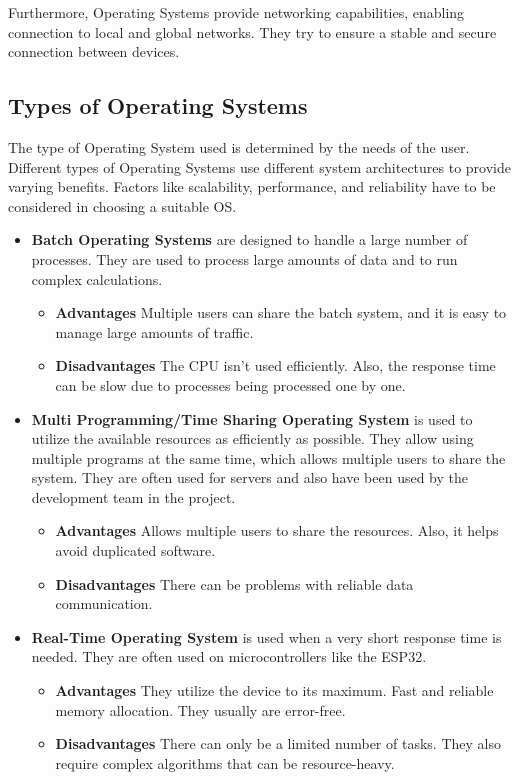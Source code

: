 Furthermore, Operating Systems provide networking capabilities, enabling connection to local and global networks. They try to ensure a stable and secure connection between devices.

\cite{WhatIsAnOs}

\subsection {Types of Operating Systems}

The type of Operating System used is determined by the needs of the user. 
Different types of Operating Systems use different system architectures to provide varying benefits.
Factors like scalability, performance, and reliability have to be considered in choosing a suitable OS.

\begin{itemize}

    \item \textbf{Batch Operating Systems} are designed to handle a large number of processes. They are used to process large amounts of data and to run complex calculations.
    \begin{itemize}
        \item \textbf{Advantages} Multiple users can share the batch system, and it is easy to manage large amounts of traffic.
        \item \textbf{Disadvantages} The CPU isn't used efficiently. Also, the response time can be slow due to processes being processed one by one.
    \end{itemize} 

    \item \textbf{Multi Programming/Time Sharing Operating System} is used to utilize the available resources as efficiently as possible. They allow using multiple programs at the same time, which allows multiple users to share the system.
    They are often used for servers and also have been used by the development team in the project.

    \begin{itemize}
        \item \textbf{Advantages} Allows multiple users to share the resources. Also, it helps avoid duplicated software.
        \item \textbf{Disadvantages} There can be problems with reliable data communication. 
    \end{itemize} 

    \item \textbf{Real-Time Operating System} is used when a very short response time is needed. They are often used on microcontrollers like the ESP32.
    \begin{itemize}
        \item \textbf{Advantages} They utilize the device to its maximum. Fast and reliable memory allocation. They usually are error-free.
        \item \textbf{Disadvantages} There can only be a limited number of tasks. They also require complex algorithms that can be resource-heavy.
    \end{itemize} 

\end{itemize}   

